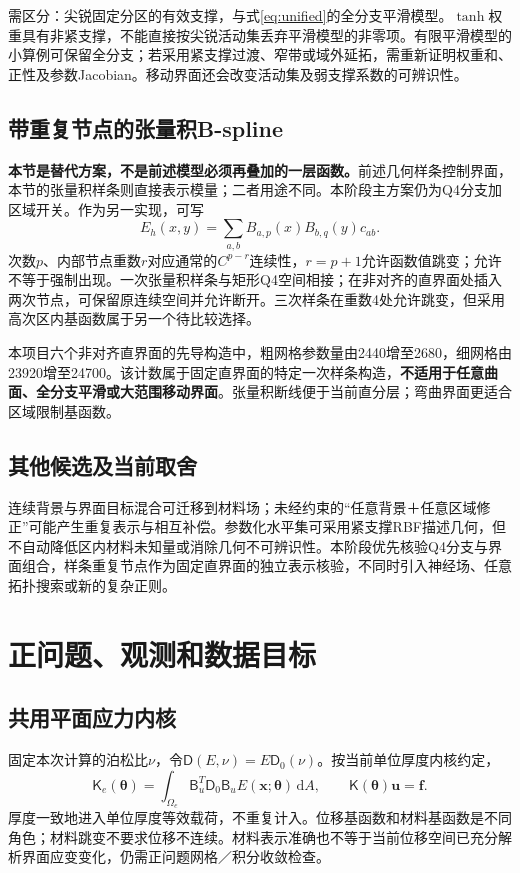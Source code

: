 \documentclass[11pt,a4paper]{ctexart}
\newcommand{\dd}{\,\mathrm d}
\newcommand{\btheta}{\boldsymbol\theta}
\begin{document}
需区分：尖锐固定分区的有效支撑，与式\eqref{eq:unified}的全分支平滑模型。$\tanh$权重具有非紧支撑，不能直接按尖锐活动集丢弃平滑模型的非零项。有限平滑模型的小算例可保留全分支；若采用紧支撑过渡、窄带或域外延拓，需重新证明权重和、正性及参数Jacobian。移动界面还会改变活动集及弱支撑系数的可辨识性。

\subsection{带重复节点的张量积B-spline}
\textbf{本节是替代方案，不是前述模型必须再叠加的一层函数。}前述几何样条控制界面，本节的张量积样条则直接表示模量；二者用途不同。本阶段主方案仍为Q4分支加区域开关。作为另一实现，可写
\begin{equation}
 E_h(x,y)=\sum_{a,b}B_{a,p}(x)B_{b,q}(y)c_{ab}.
\end{equation}
次数$p$、内部节点重数$r$对应通常的$C^{p-r}$连续性，$r=p+1$允许函数值跳变；允许不等于强制出现。一次张量积样条与矩形Q4空间相接；在非对齐的直界面处插入两次节点，可保留原连续空间并允许断开。三次样条在重数4处允许跳变，但采用高次区内基函数属于另一个待比较选择。

本项目六个非对齐直界面的先导构造中，粗网格参数量由2440增至2680，细网格由23920增至24700。该计数属于固定直界面的特定一次样条构造，\textbf{不适用于任意曲面、全分支平滑或大范围移动界面}。张量积断线便于当前直分层；弯曲界面更适合区域限制基函数。

\subsection{其他候选及当前取舍}
连续背景与界面目标混合\cite{kadu2017}可迁移到材料场；未经约束的“任意背景＋任意区域修正”可能产生重复表示与相互补偿。参数化水平集可采用紧支撑RBF描述几何，但不自动降低区内材料未知量或消除几何不可辨识性。本阶段优先核验Q4分支与界面组合，样条重复节点作为固定直界面的独立表示核验，不同时引入神经场、任意拓扑搜索或新的复杂正则。

\section{正问题、观测和数据目标}
\subsection{共用平面应力内核}
固定本次计算的泊松比$\nu$，令$\mathsf D(E,\nu)=E\mathsf D_0(\nu)$。按当前单位厚度内核约定，
\begin{equation}
 \mathsf K_e(\btheta)=\int_{\Omega_e}\mathsf B_u^T\mathsf D_0\mathsf B_u
 E(\mathbf x;\btheta)\dd A,
 \qquad \mathsf K(\btheta)\mathbf u=\mathbf f.
 \label{eq:forward}
\end{equation}
厚度一致地进入单位厚度等效载荷，不重复计入。位移基函数和材料基函数是不同角色；材料跳变不要求位移不连续。材料表示准确也不等于当前位移空间已充分解析界面应变变化，仍需正问题网格／积分收敛检查。
\end{document}
